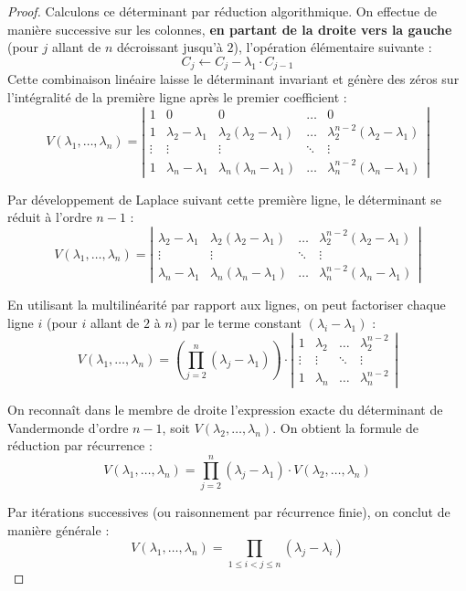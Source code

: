\documentclass[12pt, a4paper]{report}
\begin{document}
\begin{proof}
    Calculons ce déterminant par réduction algorithmique. On effectue de manière successive sur les colonnes, \textbf{en partant de la droite vers la gauche} (pour $j$ allant de $n$ décroissant jusqu'à $2$), l'opération élémentaire suivante :
    $$C_j \leftarrow C_j - \lambda_1 \cdot C_{j-1}$$
    Cette combinaison linéaire laisse le déterminant invariant et génère des zéros sur l'intégralité de la première ligne après le premier coefficient :
    $$V(\lambda_1, \dots, \lambda_n) = \left|\begin{matrix} 
        1 & 0 & 0 & \dots & 0 \\
        1 & \lambda_2 - \lambda_1 & \lambda_2(\lambda_2 - \lambda_1) & \dots & \lambda_2^{n-2}(\lambda_2 - \lambda_1) \\
        \vdots & \vdots & \vdots & \ddots & \vdots \\
        1 & \lambda_n - \lambda_1 & \lambda_n(\lambda_n - \lambda_1) & \dots & \lambda_n^{n-2}(\lambda_n - \lambda_1)
    \end{matrix}\right|$$
    
    Par développement de Laplace suivant cette première ligne, le déterminant se réduit à l'ordre $n-1$ :
    $$V(\lambda_1, \dots, \lambda_n) = \left|\begin{matrix} 
        \lambda_2 - \lambda_1 & \lambda_2(\lambda_2 - \lambda_1) & \dots & \lambda_2^{n-2}(\lambda_2 - \lambda_1) \\
        \vdots & \vdots & \ddots & \vdots \\
        \lambda_n - \lambda_1 & \lambda_n(\lambda_n - \lambda_1) & \dots & \lambda_n^{n-2}(\lambda_n - \lambda_1)
    \end{matrix}\right|$$
    
    En utilisant la multilinéarité par rapport aux lignes, on peut factoriser chaque ligne $i$ (pour $i$ allant de $2$ à $n$) par le terme constant $(\lambda_i - \lambda_1)$ :
    $$V(\lambda_1, \dots, \lambda_n) = \left( \prod_{j=2}^n (\lambda_j - \lambda_1) \right) \cdot \left|\begin{matrix} 
        1 & \lambda_2 & \dots & \lambda_2^{n-2} \\
        \vdots & \vdots & \ddots & \vdots \\
        1 & \lambda_n & \dots & \lambda_n^{n-2}
    \end{matrix}\right|$$
    
    On reconnaît dans le membre de droite l'expression exacte du déterminant de Vandermonde d'ordre $n-1$, soit $V(\lambda_2, \dots, \lambda_n)$. On obtient la formule de réduction par récurrence :
    $$V(\lambda_1, \dots, \lambda_n) = \prod_{j=2}^n (\lambda_j - \lambda_1) \cdot V(\lambda_2, \dots, \lambda_n)$$
    
    Par itérations successives (ou raisonnement par récurrence finie), on conclut de manière générale :
    $$V(\lambda_1, \dots, \lambda_n) = \prod_{1 \le i < j \le n} (\lambda_j - \lambda_i)$$
\end{proof}
\end{document}

